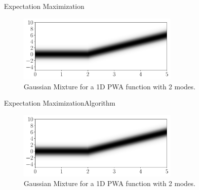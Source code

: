 \documentclass[aspectratio=169]{beamer}
\begin{document}
\begin{frame}{Expectation Maximization}
  \begin{figure}[h]
    \centering
    \includegraphics[width=0.7\textwidth]{../img/resilient_ineq/pwa.pdf}
    \caption{Gaussian Mixture for a 1D PWA function with 2 modes.}\label{fig:affine_gaussian_mixture}
  \end{figure}
\end{frame}

\begin{frame}{Expectation Maximization}{Algorithm}
  \begin{figure}[h]
    \centering
    \includegraphics[width=0.7\textwidth]{../img/resilient_ineq/pwa.pdf}
    \caption{Gaussian Mixture for a 1D PWA function with 2 modes.}\label{fig:affine_gaussian_mixture}
  \end{figure}
\end{frame}
\end{document}
